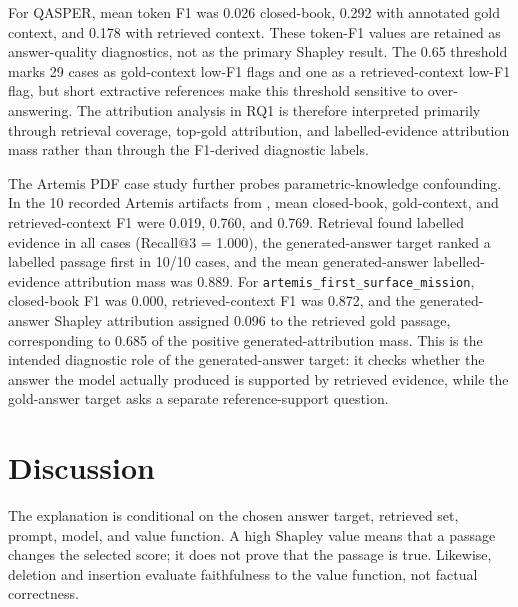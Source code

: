 \documentclass[10pt]{article}
\begin{document}
For QASPER, mean token F1 was 0.026 closed-book, 0.292 with annotated gold
context, and 0.178 with retrieved context. These token-F1 values are retained
as answer-quality diagnostics, not as the primary Shapley result. The 0.65
threshold marks 29 cases as gold-context low-F1 flags and one as a
retrieved-context low-F1 flag, but short extractive references make this
threshold sensitive to over-answering. The attribution analysis in RQ1 is
therefore interpreted primarily through retrieval coverage, top-gold
attribution, and labelled-evidence attribution mass rather than through the
F1-derived diagnostic labels.

The Artemis PDF case study further probes parametric-knowledge confounding.
In the 10 recorded Artemis artifacts from
, mean
closed-book, gold-context, and retrieved-context F1 were 0.019, 0.760, and
0.769. Retrieval found labelled evidence in all cases (Recall@3 = 1.000), the
generated-answer target ranked a labelled passage first in 10/10 cases, and the
mean generated-answer labelled-evidence attribution mass was 0.889. For
\texttt{artemis\_first\_surface\_mission}, closed-book F1 was 0.000,
retrieved-context F1 was 0.872, and the generated-answer Shapley attribution
assigned 0.096 to the retrieved gold passage, corresponding to 0.685 of the
positive generated-attribution mass. This is the intended diagnostic role of the
generated-answer target: it checks whether the answer the model actually
produced is supported by retrieved evidence, while the gold-answer target asks a
separate reference-support question.

\section{Discussion}
The explanation is conditional on the chosen answer target, retrieved set,
prompt, model, and value function. A high Shapley value means that a passage
changes the selected score; it does not prove that the passage is true.
Likewise, deletion and insertion evaluate faithfulness to the value function,
not factual correctness.
\end{document}
